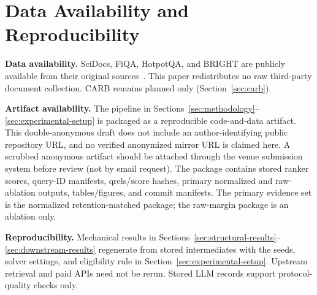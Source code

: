 \documentclass[manuscript,anonymous,review]{acmart}
\begin{document}
\section{Data Availability and Reproducibility}
\label{sec:data-availability}

\textbf{Data availability.} SciDocs, FiQA, HotpotQA, and BRIGHT are publicly
available from their original
sources~\cite{cohan2020scidocs,maia2018fiqa,yang2018hotpotqa,su2024bright}.
This paper redistributes no raw third-party document collection. CARB remains
planned only (Section~\ref{sec:carb}).

\textbf{Artifact availability.} The pipeline in
Sections~\ref{sec:methodology}--\ref{sec:experimental-setup} is packaged as a
reproducible code-and-data artifact. This double-anonymous draft does not
include an author-identifying public repository URL, and no verified anonymized
mirror URL is claimed here. A scrubbed anonymous artifact should be attached
through the venue submission system before review (not by email request). The
package contains stored ranker scores, query-ID manifests, qrels/score hashes,
primary normalized and raw-ablation outputs, tables/figures, and commit
manifests. The primary evidence set is the normalized retention-matched package;
the raw-margin package is an ablation only.

\textbf{Reproducibility.} Mechanical results in
Sections~\ref{sec:structural-results}--\ref{sec:downstream-results} regenerate
from stored intermediates with the seeds, solver settings, and eligibility rule
in Section~\ref{sec:experimental-setup}. Upstream retrieval and paid APIs need
not be rerun. Stored LLM records support protocol-quality checks only.

\begin{acks}
\end{acks}



\end{document}
